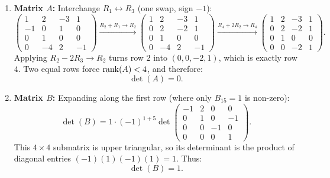 \begin{exercisesolution*}
\label{sol:determinants_via_gaussian_elimination}
\begin{enumerate}[label=\textbf{(\alph*)}]
    \item \textbf{Matrix $A$:}
    Interchange $R_1 \leftrightarrow R_3$ (one swap, sign $-1$):
    \[
    \begin{pmatrix}
      1 & 2 & -3 & 1 \\
      -1 & 0 & 1 & 0 \\
      0 & 1 & 0 & 0 \\
      0 & -4 & 2 & -1
    \end{pmatrix}
    \xrightarrow{R_2 + R_1 \to R_2}
    \begin{pmatrix}
      1 & 2 & -3 & 1 \\
      0 & 2 & -2 & 1 \\
      0 & 1 & 0 & 0 \\
      0 & -4 & 2 & -1
    \end{pmatrix}
    \xrightarrow{R_4 + 2R_2 \to R_4}
    \begin{pmatrix}
      1 & 2 & -3 & 1 \\
      0 & 2 & -2 & 1 \\
      0 & 1 & 0 & 0 \\
      0 & 0 & -2 & 1
    \end{pmatrix}.
    \]
    Applying $R_2 - 2R_3 \to R_2$ turns row $2$ into $(0, 0, -2, 1)$, which is exactly row $4$. Two equal rows force $\operatorname{rank}(A) < 4$, and therefore:
    \[
    \det(A) = 0.
    \]

    \item \textbf{Matrix $B$:}
    Expanding along the first row (where only $B_{15} = 1$ is non-zero):
    \[
    \det(B) = 1 \cdot (-1)^{1+5} \det \begin{pmatrix}
      -1 & 2 & 0 & 0 \\
      0 & 1 & 0 & -1 \\
      0 & 0 & -1 & 0 \\
      0 & 0 & 0 & 1
    \end{pmatrix}.
    \]
    This $4 \times 4$ submatrix is upper triangular, so its determinant is the product of diagonal entries $(-1)(1)(-1)(1) = 1$.
    Thus:
    \[
    \det(B) = 1.
    \]


\end{enumerate}
\end{exercisesolution*}
